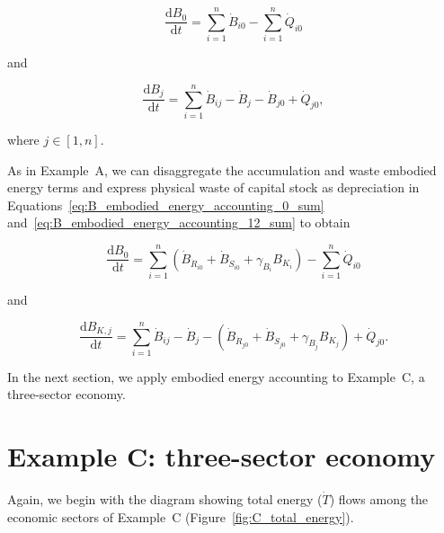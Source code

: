 \begin{equation} \label{eq:B_embodied_energy_accounting_0_sum}
	\frac{\mathrm{d}B_{0}}{\mathrm{d}t} 
	= \sum\limits_{i=1}^n\dot{B}_{i0} 
	- \sum\limits_{i=1}^n\dot{Q}_{i0} 
\end{equation}

\noindent and

\begin{equation} \label{eq:B_embodied_energy_accounting_12_sum}
	\frac{\mathrm{d}B_{j}}{\mathrm{d}t} 
	= \sum\limits_{i=1}^n\dot{B}_{ij} 
	- \dot{B}_{j}
	- \dot{B}_{j0} 
	+ \dot{Q}_{j0},
\end{equation}

\noindent where $j \in [1, n]$.

As in Example~A, 
we can disaggregate the accumulation and waste embodied energy terms 
and express physical waste of capital stock as depreciation 
in Equations~\ref{eq:B_embodied_energy_accounting_0_sum}
and~\ref{eq:B_embodied_energy_accounting_12_sum}
to obtain

\begin{equation} \label{eq:B_embodied_energy_accounting_0_with_depreciation}
	\frac{\mathrm{d}B_{0}}{\mathrm{d}t} 
	= \sum\limits_{i=1}^n 
		\left( \dot{B}_{\dot{R}_{i0}} 
				+ \dot{B}_{\dot{S}_{i0}} 
				+ \gamma_{B_{i}} B_{K_{i}} \right)
	- \sum\limits_{i=1}^n\dot{Q}_{i0} 
\end{equation}

\noindent and

\begin{equation} \label{eq:B_embodied_energy_accounting_12_with_depreciation}
	\frac{\mathrm{d}B_{K,j}}{\mathrm{d}t} 
	= \sum\limits_{i=1}^n\dot{B}_{ij} 
	- \dot{B}_{j}
	- \left( \dot{B}_{\dot{R}_{j0}}
		+ \dot{B}_{\dot{S}_{j0}}
		+ \gamma_{B_{j}} B_{K_{j}} \right)
	+ \dot{Q}_{j0}.
\end{equation}

In the next section, we apply embodied energy accounting to 
Example~C, a three-sector economy.


\section{Example C: three-sector economy} %
\label{sec:Embodied_Energy_Example_C}

Again, we begin with the diagram showing total energy ($\dot{T}$) flows
among the economic sectors of Example~C (Figure~\ref{fig:C_total_energy}).

